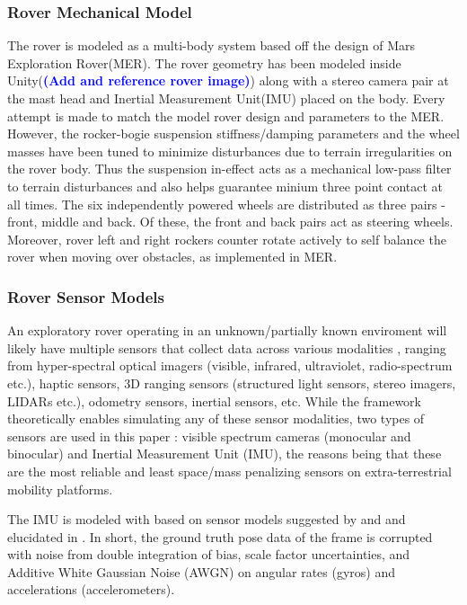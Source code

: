 \documentclass[a4paper, 10pt, conference]{ieeeconf}      %
\newcommand\coltxt[2]{\textbf{\textcolor{#1}{(#2)}}}
\newcommand\msm[1]{\coltxt{blue}{#1}}
\begin{document}
\subsubsection{Rover Mechanical Model}
The rover is modeled as a multi-body system based off the design of Mars Exploration Rover(MER). The rover geometry has been modeled inside Unity(\msm{Add and reference rover image}) along with a stereo camera pair at the mast head and Inertial Measurement Unit(IMU) placed on the body. Every attempt is made to match the model rover design and parameters to the MER\cite{crisp2003mars}. However, the rocker-bogie suspension stiffness/damping parameters and the wheel masses have been tuned to minimize disturbances due to terrain irregularities on the rover body. Thus the suspension in-effect acts as a mechanical low-pass filter to terrain disturbances and also helps guarantee minium three point contact at all times. The six independently powered wheels are distributed as three pairs - front, middle and back. Of these, the front and back pairs act as steering wheels. Moreover, rover left and right rockers counter rotate actively to self balance the rover when moving over obstacles, as implemented in MER.
\subsubsection{Rover Sensor Models}
An exploratory rover operating in an unknown/partially known enviroment will likely have multiple sensors that collect data across various modalities \cite{borenstein1997mobile,ruocco2013robot}, ranging from hyper-spectral optical imagers (visible, infrared, ultraviolet, radio-spectrum etc.), haptic sensors, 3D ranging sensors (structured light sensors, stereo imagers, LIDARs etc.), odometry sensors, inertial sensors, etc. While the framework theoretically enables simulating any of these sensor modalities, two types of sensors are used in this paper : visible spectrum cameras (monocular and binocular)  and Inertial Measurement Unit (IMU), the reasons being that these are the most reliable and least space/mass penalizing sensors on extra-terrestrial mobility platforms. 

The IMU is modeled with based on sensor models suggested by \cite{savage1998strapdown1} and \cite{savage1998strapdown2} and elucidated in \cite{titterton2004strapdown}. In short, the ground truth pose data of the frame is corrupted with noise from double integration of bias, scale factor uncertainties, and Additive White Gaussian Noise (AWGN) on angular rates (gyros) and accelerations (accelerometers).
\end{document}
